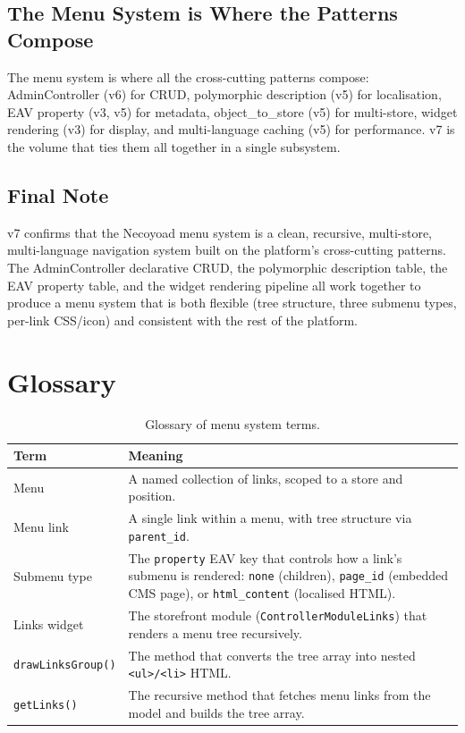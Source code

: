 \documentclass[11pt,a4paper]{article}
\begin{document}
\subsection{The Menu System is Where the Patterns Compose}

The menu system is where all the cross-cutting patterns compose:
AdminController (v6) for CRUD, polymorphic description (v5) for
localisation, EAV property (v3, v5) for metadata,
object\_to\_store (v5) for multi-store, widget rendering (v3) for
display, and multi-language caching (v5) for performance. v7 is
the volume that ties them all together in a single subsystem.

\subsection{Final Note}

v7 confirms that the Necoyoad menu system is a clean, recursive,
multi-store, multi-language navigation system built on the
platform's cross-cutting patterns. The AdminController declarative
CRUD, the polymorphic description table, the EAV property table, and
the widget rendering pipeline all work together to produce a menu
system that is both flexible (tree structure, three submenu types,
per-link CSS/icon) and consistent with the rest of the platform.

\appendix
\section{Glossary}\label{app:glossary}
\begin{table}[htbp]
\centering
\caption{Glossary of menu system terms.}\label{tab:glossary-v7}
\footnotesize\sloppy
\begin{tabularx}{\columnwidth}{>{\raggedright\arraybackslash}p{3.5cm}X}
\toprule
\textbf{Term} & \textbf{Meaning} \\
\midrule
Menu & A named collection of links, scoped to a store and position. \\
Menu link & A single link within a menu, with tree structure via \texttt{parent\_id}. \\
Submenu type & The \texttt{property} EAV key that controls how a link's submenu is rendered: \texttt{none} (children), \texttt{page\_id} (embedded CMS page), or \texttt{html\_content} (localised HTML). \\
Links widget & The storefront module (\texttt{ControllerModuleLinks}) that renders a menu tree recursively. \\
\texttt{drawLinksGroup()} & The method that converts the tree array into nested \texttt{<ul>/<li>} HTML. \\
\texttt{getLinks()} & The recursive method that fetches menu links from the model and builds the tree array. \\
\bottomrule
\end{tabularx}
\end{table}
\end{document}
